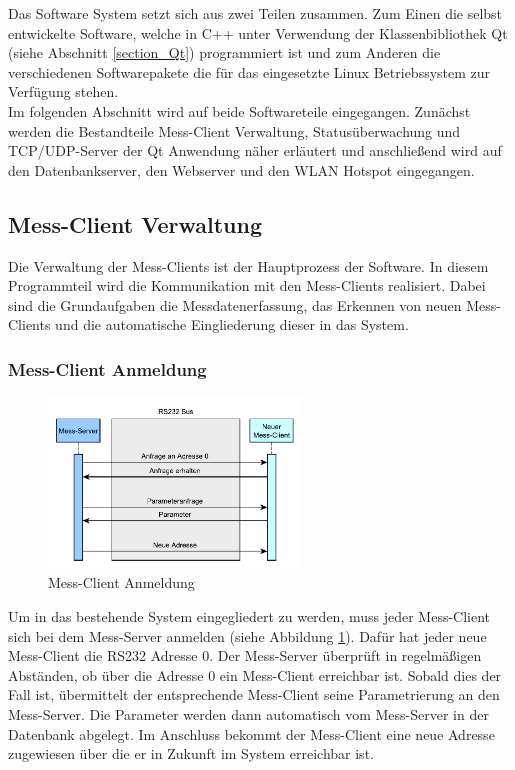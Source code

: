 Das Software System setzt sich aus zwei Teilen zusammen. Zum Einen die selbst entwickelte Software, welche in C++ unter Verwendung der Klassenbibliothek Qt (siehe Abschnitt \ref{section_Qt}) programmiert ist und zum Anderen die verschiedenen Softwarepakete die für das eingesetzte Linux Betriebssystem zur Verfügung stehen.\\
Im folgenden Abschnitt wird auf beide Softwareteile eingegangen. Zunächst werden die Bestandteile Mess-Client Verwaltung, Statusüberwachung und TCP/UDP-Server der Qt Anwendung näher erläutert und anschließend wird auf den Datenbankserver, den Webserver und den WLAN Hotspot eingegangen.

\subsection{Mess-Client Verwaltung}
\label{section_messclientverwaltung}
Die Verwaltung der Mess-Clients ist der Hauptprozess der Software. In diesem Programmteil wird die Kommunikation mit den Mess-Clients realisiert. Dabei sind die Grundaufgaben die Messdatenerfassung, das Erkennen von neuen Mess-Clients und die automatische Eingliederung dieser in das System.

\subsubsection{Mess-Client Anmeldung}

\begin{figure}[H]
\begin{center}
\includegraphics[width=0.6\textwidth ]{img/general/MessClientAnmeldung.pdf}
\caption{Mess-Client Anmeldung}
\label{figure_MessClientAnmeldung}
\end{center}
\end{figure}
 
 
Um in das bestehende System eingegliedert zu werden, muss jeder Mess-Client sich bei dem Mess-Server anmelden (siehe Abbildung \ref{figure_MessClientAnmeldung}). Dafür hat jeder neue Mess-Client die RS232 Adresse 0. Der Mess-Server überprüft in regelmäßigen Abständen, ob über die Adresse 0 ein Mess-Client erreichbar ist. Sobald dies der Fall ist, übermittelt der entsprechende Mess-Client seine Parametrierung an den Mess-Server. Die Parameter werden dann automatisch vom Mess-Server in der Datenbank abgelegt. Im Anschluss bekommt der Mess-Client eine neue Adresse zugewiesen über die er in Zukunft im System erreichbar ist.


